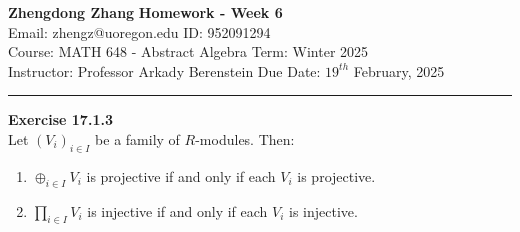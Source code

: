 \documentclass[a4paper, 12pt]{article}
\newenvironment{problem}[2][Exercise]
    { \begin{mdframed}[backgroundcolor=gray!20] \textbf{#1 #2} \\}
    {  \end{mdframed}}
\begin{document}
\noindent
\large\textbf{Zhengdong Zhang} \hfill \textbf{Homework - Week 6}   \\
Email: zhengz@uoregon.edu \hfill ID: 952091294 \\
\normalsize Course: MATH 648 - Abstract Algebra  \hfill Term: Winter 2025\\
Instructor: Professor Arkady Berenstein \hfill Due Date: $19^{th}$ February, 2025 \\
\noindent\rule{7in}{2.8pt}
\begin{problem}{17.1.3}
Let \((V_i)_{i\in I}\) be a family of \(R\)-modules. Then:
\begin{enumerate}[(1)]
\item \(\oplus_{i\in I}V_i\) is projective if and only if each \(V_i\) is projective. 
\item \(\prod_{i\in I}V_i\) is injective if and only if each \(V_i\) is injective. 
\end{enumerate}
\end{problem}
\end{document}
